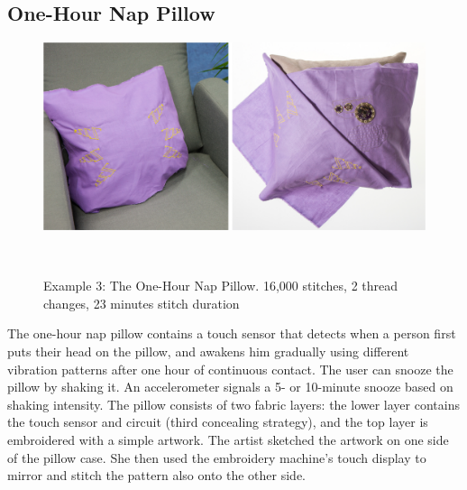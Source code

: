 \documentclass[header.tex]{subfiles}
\begin{document}
\subsection{One-Hour Nap Pillow}
\begin{figure} [h!]
\centering
  \includegraphics[width=1\columnwidth]{figures/Pillow}
  \caption{Example 3: The One-Hour Nap Pillow. 16,000 stitches, 2 thread changes, 23 minutes stitch duration}~\label{fig:Pillow}
  \vspace{-1.5em}
\end{figure}
The one-hour nap pillow contains a touch sensor that detects when a person first puts their head on the pillow, and awakens him gradually using different vibration patterns after one hour of continuous contact. The user can snooze the pillow by shaking it. An accelerometer signals a 5- or 10-minute snooze based on shaking intensity. The pillow consists of two fabric layers: the lower layer contains the touch sensor and circuit (third concealing strategy), and the top layer is embroidered with a simple artwork. The artist sketched the artwork on one side of the pillow case. She then used the embroidery machine's touch display to mirror and stitch the pattern also onto the other side. 
\end{document}
